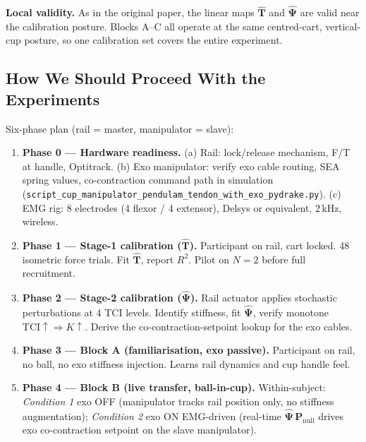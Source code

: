 \documentclass[11pt, a4paper]{article}
\begin{document}
\begin{infobox}
\textbf{Local validity.}  As in the original paper, the linear maps
\(\hat{\mathbf T}\) and \(\hat{\boldsymbol\Psi}\) are valid near the
calibration posture.  Blocks A--C all operate at the same centred-cart,
vertical-cup posture, so one calibration set covers the entire experiment.
\end{infobox}

\subsection{How We Should Proceed With the Experiments}

\begin{actionbox}
Six-phase plan (rail = master, manipulator = slave):
\begin{enumerate}[nosep]
  \item \textbf{Phase 0 --- Hardware readiness.}
        (a) Rail: lock/release mechanism, F/T at handle, Optitrack.
        (b) Exo manipulator: verify exo cable routing, SEA spring values,
        co-contraction command path in simulation
        (\texttt{script\_cup\_manipulator\_pendulam\_tendon\_with\_exo\_pydrake.py}).
        (c) EMG rig: 8 electrodes (4 flexor / 4 extensor), Delsys or
        equivalent, 2\,kHz, wireless.
  \item \textbf{Phase 1 --- Stage-1 calibration (\(\hat{\mathbf T}\)).}
        Participant on rail, cart locked.  48 isometric force trials.
        Fit \(\hat{\mathbf T}\), report \(R^2\).
        Pilot on \(N=2\) before full recruitment.
  \item \textbf{Phase 2 --- Stage-2 calibration (\(\hat{\boldsymbol\Psi}\)).}
        Rail actuator applies stochastic perturbations at 4 TCI levels.
        Identify stiffness, fit \(\hat{\boldsymbol\Psi}\), verify monotone
        \(\mathrm{TCI}\uparrow\Rightarrow K\uparrow\).  Derive the
        co-contraction-setpoint lookup for the exo cables.
  \item \textbf{Phase 3 --- Block A (familiarisation, exo passive).}
        Participant on rail, no ball, no exo stiffness injection.
        Learns rail dynamics and cup handle feel.
  \item \textbf{Phase 4 --- Block B (live transfer, ball-in-cup).}
        Within-subject: \emph{Condition 1} exo OFF (manipulator tracks
        rail position only, no stiffness augmentation);
        \emph{Condition 2} exo ON EMG-driven (real-time
        \(\hat{\boldsymbol\Psi}\,\mathbf P_{\text{null}}\) drives exo
        co-contraction setpoint on the slave manipulator).

\end{enumerate}
\end{actionbox}
\end{document}
